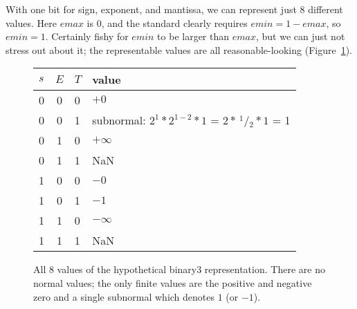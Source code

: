 \documentclass[twocolumn]{article}
\newcommand\sfrac[2]{\!{}\,^{#1}\!/{}\!_{#2}}
\newcommand\nan{\textsf{NaN}}
\begin{document}
With one bit for sign, exponent, and mantissa, we can represent just 8
different values. Here $emax$ is $0$, and the standard clearly
requires $emin = 1 - emax$, so $emin = 1$. Certainly fishy for $emin$
to be larger than $emax$, but we can just not stress out about it; the
representable values are all reasonable-looking
(Figure~\ref{fig:allvalues3}).


\begin{figure}[h]
\begin{tabular}{|l@{\,}c@{\,}l|p{2.5in}|}
\hline
  $s$ & $E$ & $T$ & value \\
  \hline
0 & 0 & 0 &   $+0$ \\
0 & 0 & 1 &    subnormal: %
                $2^1 * 2^{1-2} * 1$ =
                $2 * \sfrac{1}{2} * 1$ = 1 \\
0 & 1 & 0 &   $+\infty$ \\
0 & 1 & 1 &    \nan \\
1 & 0 & 0 &   $-0$ \\
1 & 0 & 1 &   $-1$ \\
1 & 1 & 0 &   $-\infty$ \\
1 & 1 & 1 &    \nan \\
\hline
\end{tabular}
\caption{All 8 values of the hypothetical binary3 representation.
  There are no normal values; the only finite values are the
  positive and negative zero and a single subnormal which
  denotes $1$ (or $-1$).
} \label{fig:allvalues3}
\end{figure}



\nocite{ieee754}
{}

\end{document}
